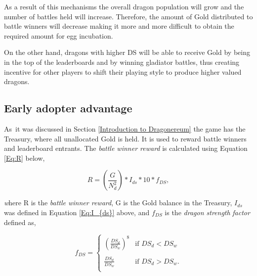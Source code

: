 \documentclass[12pt]{article}
\begin{document}
{As a result of this mechanisms the overall dragon population will grow and the number of battles held will increase. Therefore, the amount of Gold distributed to battle winners will decrease making it more and more difficult to obtain the required amount for egg incubation.\par

On the other hand, dragons with higher DS\textit{ }will be able to receive Gold by being in the top of the leaderboards and by winning gladiator battles, thus creating incentive for other players to shift their playing style to produce higher valued dragons.\par

\subsection{Early adopter advantage}
\label{Early adopter advantage} \par

As\ it was discussed in  Section \ref{Introduction to Dragonereum}  the game has the Treasury, where all unallocated Gold is held. It is used to reward battle winners and leaderboard entrants. The \textit{battle winner reward} is calculated using Equation \ref{Eq:R}  below,\par


\begin{center}
  \begin{equation}\label{Eq:R}
    R=\left(\frac{G}{N_d^2}\right)*I_{ds}*10*f_{DS},
  \end{equation}
\end{center}

\vspace{\baselineskip}
\textit{w}here R is the \textit{battle winner reward}, G is the Gold balance in the Treasury, $I_{ds}$ was defined in Equation \ref{Eq:I_{ds}} above, and $f_{DS}$ is the \textit{dragon strength} \textit{factor} defined as,\par


\begin{center}
  \begin{equation}
   f_{DS}=\begin{cases}
     \left(\frac{DS_{d}}{DS_{w}}\right)^8 & \mbox{if }  DS_{d} < DS_{w}\\
     \\
     \frac{DS_{d}}{DS_{w}} & \mbox{if } DS_{d}>DS_{w}.\\
    \end{cases}
  \end{equation}
\end{center}

}
\end{document}
